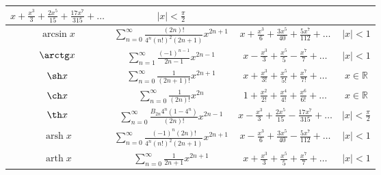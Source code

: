 \begin{tabu}[t]{||c|c|c|c||}
		$\displaystyle x + \frac{x^3}{3} + \frac{2x^5}{15} + \frac{17x^7}{315} + \ldots $ &
		$\displaystyle |x| < \frac{\pi}{2} $ \\
	\hline
		$\displaystyle \arcsin x $ &
		$\displaystyle \sum^{\infty}_{n=0} \frac{(2n)!}{4^n (n!)^2 (2n+1)} x^{2n+1} $ &
		$\displaystyle x + \frac{x^3}{6} + \frac{3x^5}{40} + \frac{5x^7}{112} + \ldots $ &
		$\displaystyle |x| < 1 $ \\
	\hline
		$\displaystyle \arctg x $ &
		$\displaystyle \sum^{\infty}_{n=1} \frac{(-1)^{n-1}}{2n-1} x^{2n-1} $ &
		$\displaystyle x - \frac{x^3}{3} + \frac{x^5}{5} - \frac{x^7}{7} + \ldots $ &
		$\displaystyle |x| < 1 $ \\
	\hline
		$\displaystyle \sh x $ &
		$\displaystyle \sum^{\infty}_{n=0} \frac{1}{(2n+1)!} x^{2n+1} $ &
		$\displaystyle x + \frac{x^3}{3!} + \frac{x^5}{5!} + \frac{x^7}{7!} + \ldots $ &
		$\displaystyle x\in\mathbb{R} $ \\
	\hline
		$\displaystyle \ch x $ &
		$\displaystyle \sum^{\infty}_{n=0} \frac{1}{(2n)!} x^{2n} $ &
		$\displaystyle 1 + \frac{x^2}{2!} + \frac{x^4}{4!} + \frac{x^6}{6!} + \ldots $ &
		$\displaystyle x\in\mathbb{R} $ \\
	\hline
		$\displaystyle \th x $ &
		$\displaystyle \sum_{n=0}^{\infty} \frac{B_{2n}4^n(1-4^n)}{(2n)!} x^{2n-1} $ &
		$\displaystyle x - \frac{x^3}{3} + \frac{2x^5}{15} - \frac{17x^7}{315} + \ldots $ &
		$\displaystyle |x| < \frac{\pi}{2} $ \\
	\hline
		$\displaystyle \operatorname{arsh} x $ &
		$\displaystyle \sum^{\infty}_{n=0} \frac{(-1)^n (2n)!}{4^n (n!)^2 (2n+1)} x^{2n+1} $ &
		$\displaystyle x - \frac{x^3}{6} + \frac{3x^5}{40} - \frac{5x^7}{112} + \ldots $ &
		$\displaystyle |x| < 1 $ \\
	\hline
		$\displaystyle \operatorname{arth} x $ &
		$\displaystyle \sum^{\infty}_{n=0} \frac{1}{2n + 1} x^{2n+1} $ &
		$\displaystyle x + \frac{x^3}{3} + \frac{x^5}{5} + \frac{x^7}{7} + \ldots $ &
		$\displaystyle |x| < 1 $ \\
	\hline
\end{tabu}
